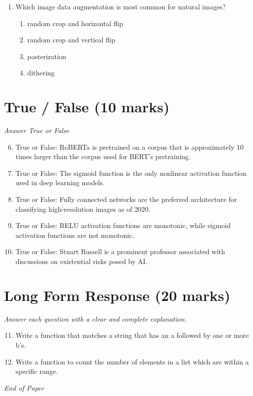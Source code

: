 \documentclass[12pt]{article}
\begin{document}
\begin{enumerate}[label=\arabic*.]
\begin{enumerate}[label=(\alph*)]
    \item It is used for prediction.
    \item It may be used for interpretation.
    \item It discovers causal relationships
\end{enumerate}
\item Which image data augmentation is most common for natural images?
\begin{enumerate}[label=(\alph*)]
    \item random crop and horizontal flip
    \item random crop and vertical flip
    \item posterization
    \item dithering
\end{enumerate}
\end{enumerate}

\section*{True / False (10 marks)}
\textit{Answer True or False}
\begin{enumerate}[label=\arabic*.]
\setcounter{enumi}{5}
\item True or False: RoBERTa is pretrained on a corpus that is approximately 10 times larger than the corpus used for BERT's pretraining.
\item True or False: The sigmoid function is the only nonlinear activation function used in deep learning models.
\item True or False: Fully connected networks are the preferred architecture for classifying high-resolution images as of 2020.
\item True or False: RELU activation functions are monotonic, while sigmoid activation functions are not monotonic.
\item True or False: Stuart Russell is a prominent professor associated with discussions on existential risks posed by AI.
\end{enumerate}

\section*{Long Form Response (20 marks)}
\textit{Answer each question with a clear and complete explanation.}
\begin{enumerate}[label=\arabic*.]
\setcounter{enumi}{10}
\item Write a function that matches a string that has an a followed by one or more b's.
\item Write a function to count the number of elements in a list which are within a specific range.
\end{enumerate}

\vfill
\noindent\textit{End of Paper}
\end{document}
